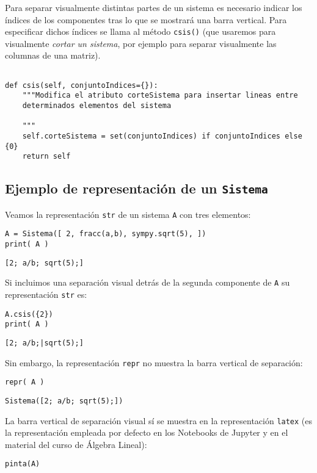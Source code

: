 \documentclass[11pt]{report}
\begin{document}
Para separar visualmente distintas partes de un sistema es necesario
indicar los índices de los componentes tras lo que se mostrará una
barra vertical. Para especificar dichos índices se llama al método
\texttt{csis()} (que usaremos para visualmente \emph{cortar un sistema}, por
ejemplo para separar visualmente las columnas de una matriz).
\begin{verbatim}

def csis(self, conjuntoIndices={}):
    """Modifica el atributo corteSistema para insertar lineas entre
    determinados elementos del sistema

    """
    self.corteSistema = set(conjuntoIndices) if conjuntoIndices else {0}
    return self

\end{verbatim}

\subsection{Ejemplo de representación de un \texttt{Sistema}}
\label{sec:org8bc0e41}
Veamos la representación \texttt{str} de un sistema \texttt{A} con tres elementos:
\begin{verbatim}
A = Sistema([ 2, fracc(a,b), sympy.sqrt(5), ])
print( A )
\end{verbatim}

\texttt{[2; a/b; sqrt(5);]}

Si incluimos una separación visual detrás de la segunda componente de
\texttt{A} su representación \texttt{str} es:
\begin{verbatim}
A.csis({2})
print( A )
\end{verbatim}

\texttt{[2; a/b;|sqrt(5);]}

Sin embargo, la representación \texttt{repr} no muestra la barra vertical de
separación:
\begin{verbatim}
repr( A )
\end{verbatim}

\texttt{Sistema([2; a/b; sqrt(5);])}

La barra vertical de separación visual sí se muestra en la
representación \texttt{latex} (es la representación empleada por defecto en
los Notebooks de Jupyter y en el material del curso de Álgebra
Lineal):
\begin{verbatim}
pinta(A)
\end{verbatim}
\end{document}

